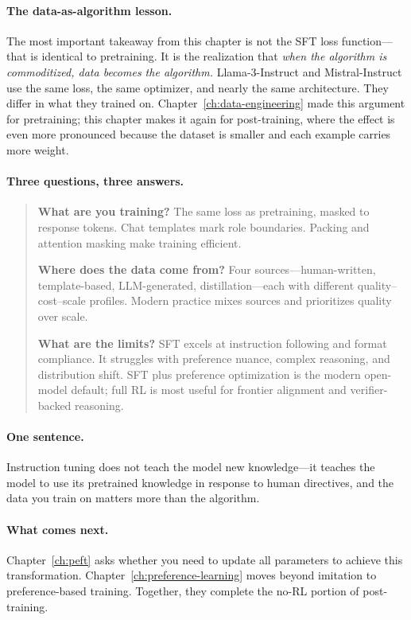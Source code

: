 \paragraph{The data-as-algorithm lesson.} The most important takeaway from this chapter is not the SFT loss function---that is identical to pretraining. It is the realization that \emph{when the algorithm is commoditized, data becomes the algorithm.} Llama-3-Instruct and Mistral-Instruct use the same loss, the same optimizer, and nearly the same architecture. They differ in what they trained on. Chapter~\ref{ch:data-engineering} made this argument for pretraining; this chapter makes it again for post-training, where the effect is even more pronounced because the dataset is smaller and each example carries more weight.

\paragraph{Three questions, three answers.}

\begin{quote}
\textbf{What are you training?} The same loss as pretraining, masked to response tokens. Chat templates mark role boundaries. Packing and attention masking make training efficient.

\smallskip
\textbf{Where does the data come from?} Four sources---human-written, template-based, LLM-generated, distillation---each with different quality--cost--scale profiles. Modern practice mixes sources and prioritizes quality over scale.

\smallskip
\textbf{What are the limits?} SFT excels at instruction following and format compliance. It struggles with preference nuance, complex reasoning, and distribution shift. SFT plus preference optimization is the modern open-model default; full RL is most useful for frontier alignment and verifier-backed reasoning.
\end{quote}

\paragraph{One sentence.} Instruction tuning does not teach the model new knowledge---it teaches the model to use its pretrained knowledge in response to human directives, and the data you train on matters more than the algorithm.

\paragraph{What comes next.} Chapter~\ref{ch:peft} asks whether you need to update all parameters to achieve this transformation. Chapter~\ref{ch:preference-learning} moves beyond imitation to preference-based training. Together, they complete the no-RL portion of post-training.


